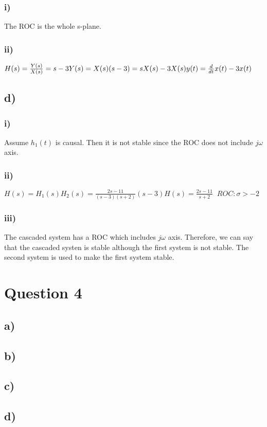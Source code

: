 \documentclass[12pt]{article}
\begin{document}
    \subsubsection*{i)}    
    The ROC is the whole s-plane.   
    
    \subsubsection*{ii)}
    \begin{math}
        H(s) = \frac{Y(s)}{X(s)} = s-3\\
        Y(s) = X(s)(s-3) = sX(s) -3X(s)\\
        y(t) = \frac{d}{dt}x(t) - 3x(t)
    \end{math}
    
    \subsection*{d)}
    \subsubsection*{i)}       
    Assume \(h_1(t)\) is causal. Then it is not stable since the ROC does not include \(j\omega\) axis.
    \subsubsection*{ii)}
    \begin{math}
        H(s) = H_1(s)H_2(s) = \frac{2s-11}{(s-3)(s+2)}(s-3)
        H(s) = \frac{2s-11}{s+2} \;\; ROC: \sigma > -2 
    \end{math}
    \subsubsection*{iii)}
    The cascaded system has a ROC which includes \(j\omega\) axis. Therefore, we can say that the cascaded 
    systen is stable although the first system is not stable. The second system is used to make the first 
    system stable.
       
    \section*{Question 4}
    \subsection*{a)}
    
     \subsection*{b)}
    
     \subsection*{c)}
    
     \subsection*{d)}     
    
\end{document}
